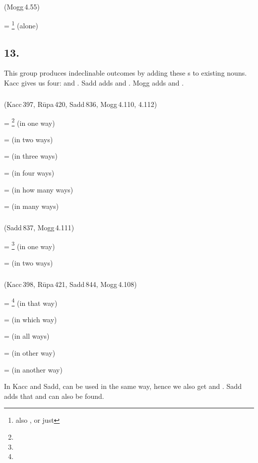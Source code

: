\subparagraph*{} (Mogg\,4.55)\label{pacct12:aakii}

 = \footnote{also , or just } (alone) \par

\subsection*{13.\ }\label{tadgroup13}

This group produces indeclinable outcomes by adding these s to existing nouns. Kacc gives us four:  and . Sadd adds  and . Mogg adds  and .

\subparagraph*{} (Kacc\,397, R\=upa\,420, Sadd\,836, Mogg\,4.110, 4.112)\label{pacct13:dhaa}\label{pacct13:edhaa}

 = \footnote{} (in one way) \par
{} =  (in two ways) \par
{} =  (in three ways) \par
{} =  (in four ways) \par
{} =  (in how many ways) \par
{} =  (in many ways) \par

\subparagraph*{} (Sadd\,837, Mogg\,4.111)\label{pacct13:jjha}

 = \footnote{} (in one way) \par
{} =  (in two ways) \par

\subparagraph*{} (Kacc\,398, R\=upa\,421, Sadd\,844, Mogg\,4.108)\label{pacct13:thaa}\label{pacct13:thatthaa}

 = \footnote{} (in that way) \par
{} =  (in which way) \par
{} =  (in all ways) \par
{} =  (in other way) \par
{} =  (in another way) \par
In Kacc and Sadd,  can be used in the same way, hence we also get  and . Sadd adds that  and  can also be found.

